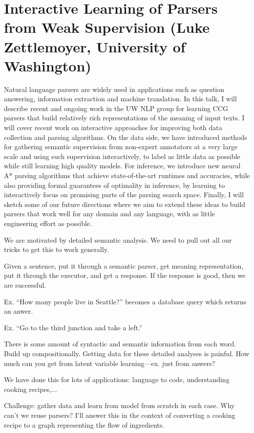 \section{Interactive Learning of Parsers from Weak Supervision (Luke Zettlemoyer, University of Washington)}

Natural language parsers are widely used in applications such as question answering, information extraction and machine translation. In this talk, I will describe recent and ongoing work in the UW NLP group for learning CCG parsers that build relatively rich representations of the meaning of input texts. I will cover recent work on interactive approaches for improving both data collection and parsing algorithms. On the data side, we have introduced methods for gathering semantic supervision from non-expert annotators at a very large scale and using such supervision interactively, to label as little data as possible while still learning high quality models. For inference, we introduce new neural A* parsing algorithms that achieve state-of-the-art runtimes and accuracies, while also providing formal guarantees of optimality in inference, by learning to interactively focus on promising parts of the parsing search space. Finally, I will sketch some of our future directions where we aim to extend these ideas to build parsers that work well for any domain and any language, with as little engineering effort as possible.

We are motivated by detailed semantic analysis. We need to pull out all our tricks to get this to work generally.

Given a sentence, put it through a semantic parser, get meaning representation, put it through the executor, and get a response. If the response is good, then we are successful. 

Ex. ``How many people live in Seattle?'' becomes a database query which returns an anwer.

Ex. ``Go to the third junction and take a left.''

There is some amount of syntactic and semantic information from each word. Build up compositionally.
Getting data for these detailed analyses is painful. How much can you get from latent variable learning---ex. just from anwers?

We have done this for lots of applications: language to code, understanding cooking recipes,...

Challenge: gather data and learn from model from scratch in each case. Why can't we reuse parsers?
I'll answer this in the context of converting a cooking recipe to a graph representing the flow of ingredients.

